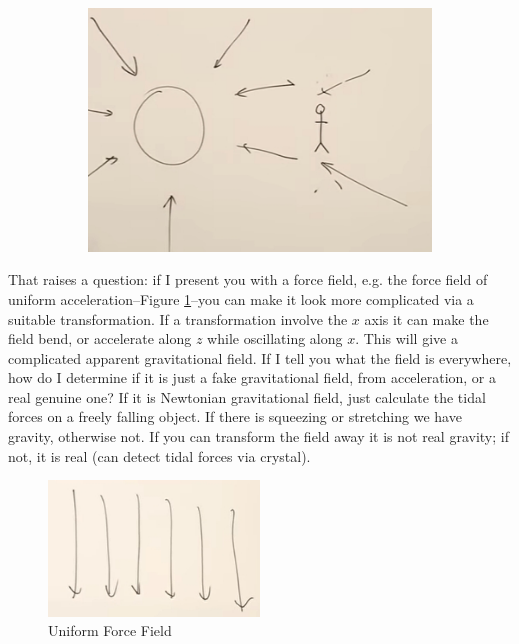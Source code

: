 \documentclass[]{article}
\begin{document}
\begin{figure}[H]
\begin{center}
\begin{subfigure}[t]{0.45\textwidth}
			\includegraphics[width=\textwidth]{gr-1-suns-gravitational-field-2000-mile}
		\end{subfigure}
	\end{center}
\end{figure}

That raises a question: if I present you with a force field, e.g. the force field of uniform acceleration--Figure \ref{fig:gr-1-uniform-force-field}--you can make it look more complicated via a suitable transformation. If a transformation involve the $x$ axis it can make the field bend, or accelerate along $z$ while oscillating along $x$. This will give a complicated apparent gravitational field. If I tell you what the field is everywhere, how do I determine if it is just a fake gravitational field, from acceleration, or a real genuine one? If it is Newtonian gravitational field, just calculate the tidal forces on a freely falling object. If there is squeezing or stretching we have gravity,  otherwise not. If you can transform the field away it is not real gravity; if not, it is real (can detect tidal forces via crystal).

\begin{figure}[H]
	\begin{center}
		\caption{Uniform Force Field}\label{fig:gr-1-uniform-force-field}
		\includegraphics[width=0.5\textwidth]{gr-1-uniform-force-field}
	\end{center}
\end{figure}
\end{document}
